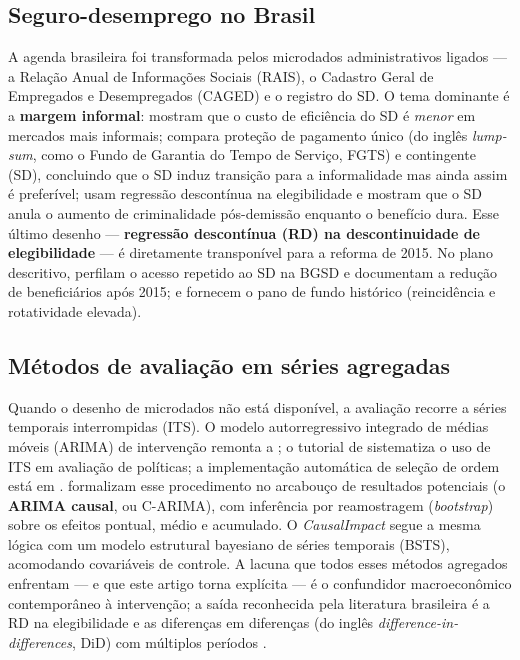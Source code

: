 \documentclass[12pt,a4paper]{article}
\begin{document}
\subsection{Seguro-desemprego no Brasil}
A agenda brasileira foi transformada pelos microdados administrativos ligados --- a Relação Anual de Informações Sociais (RAIS), o Cadastro Geral de Empregados e Desempregados (CAGED) e o registro do SD. O tema dominante é a \textbf{margem informal}: \citet{gerardgonzaga2021informal} mostram que o custo de eficiência do SD é \textit{menor} em mercados mais informais; \citet{britto2022employment} compara proteção de pagamento único (do inglês \textit{lump-sum}, como o Fundo de Garantia do Tempo de Serviço, FGTS) e contingente (SD), concluindo que o SD induz transição para a informalidade mas ainda assim é preferível; \citet{brittopinottisampaio2022crime} usam regressão descontínua na elegibilidade e mostram que o SD anula o aumento de criminalidade pós-demissão enquanto o benefício dura. Esse último desenho --- \textbf{regressão descontínua (RD) na descontinuidade de elegibilidade} --- é diretamente transponível para a reforma de 2015. No plano descritivo, \citet{amorim2024perfil} perfilam o acesso repetido ao SD na BGSD e documentam a redução de beneficiários após 2015; \citet{balbinottozylberstajn2002uso} e \citet{gonzaga2003labor} fornecem o pano de fundo histórico (reincidência e rotatividade elevada).

\subsection{Métodos de avaliação em séries agregadas}
Quando o desenho de microdados não está disponível, a avaliação recorre a séries temporais interrompidas (ITS). O modelo autorregressivo integrado de médias móveis (ARIMA) de intervenção remonta a \citet{boxtiao1975intervention}; o tutorial de \citet{bernal2017interrupted} sistematiza o uso de ITS em avaliação de políticas; a implementação automática de seleção de ordem está em \citet{hyndmankhandakar2008forecast}. \citet{menchetti2023carima} formalizam esse procedimento no arcabouço de resultados potenciais (o \textbf{ARIMA causal}, ou C-ARIMA), com inferência por reamostragem (\textit{bootstrap}) sobre os efeitos pontual, médio e acumulado. O \textit{CausalImpact} \citep{brodersen2015causalimpact} segue a mesma lógica com um modelo estrutural bayesiano de séries temporais (BSTS), acomodando covariáveis de controle. A lacuna que todos esses métodos agregados enfrentam --- e que este artigo torna explícita --- é o confundidor macroeconômico contemporâneo à intervenção; a saída reconhecida pela literatura brasileira é a RD na elegibilidade \citep{leelemieux2010rdd,calonico2014robust,brittopinottisampaio2022crime} e as diferenças em diferenças (do inglês \textit{difference-in-differences}, DiD) com múltiplos períodos \citep{callawaysantanna2021did}.
\end{document}
